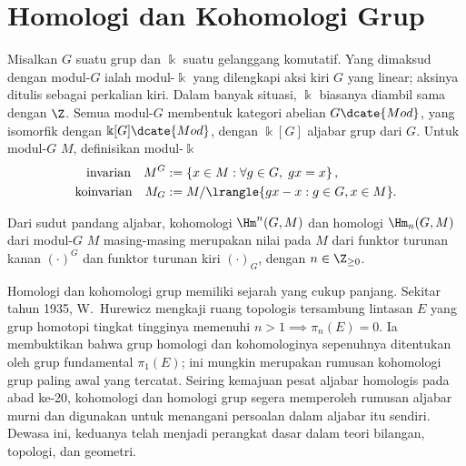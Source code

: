 
\chapter{Homologi dan Kohomologi Grup}\label{sec:group-coh}
\hypertarget{o014.aljabr2.chapter6.overview-g-modules-resolutions}{ }

Misalkan $G$ suatu grup dan $\Bbbk$ suatu gelanggang komutatif. Yang dimaksud
dengan modul-$G$ ialah modul-$\Bbbk$ yang dilengkapi aksi kiri $G$ yang linear;
aksinya ditulis sebagai perkalian kiri. Dalam banyak situasi, $\Bbbk$ biasanya
diambil sama dengan $\Z$. Semua modul-$G$ membentuk kategori abelian
$G\dcate{Mod}$, yang isomorfik dengan $\Bbbk[G]\dcate{Mod}$, dengan
$\Bbbk[G]$ aljabar grup dari $G$. Untuk modul-$G$ $M$, definisikan
modul-$\Bbbk$
\begin{align*}
	\text{invarian} \quad M^G & := \left\{x \in M: \forall g \in G, \; gx=x \right\}, \\
	\text{koinvarian} \quad M_G & := M / \lrangle{gx-x: g \in G, x \in M}.
\end{align*}

Dari sudut pandang aljabar, kohomologi $\Hm^n(G,M)$ dan homologi
$\Hm_n(G,M)$ dari modul-$G$ $M$ masing-masing merupakan nilai pada $M$ dari
funktor turunan kanan $(\cdot)^G$ dan funktor turunan kiri $(\cdot)_G$, dengan
$n\in\Z_{\geq0}$.

Homologi dan kohomologi grup memiliki sejarah yang cukup panjang. Sekitar tahun
1935, W.\ Hurewicz mengkaji ruang topologis tersambung lintasan $E$ yang grup
homotopi tingkat tingginya memenuhi
$n>1\implies\pi_n(E)=0$. Ia membuktikan bahwa grup homologi dan kohomologinya
sepenuhnya ditentukan oleh grup fundamental $\pi_1(E)$; ini mungkin merupakan
rumusan kohomologi grup paling awal yang tercatat. Seiring kemajuan pesat
aljabar homologis pada abad ke-20, kohomologi dan homologi grup segera
memperoleh rumusan aljabar murni dan digunakan untuk menangani persoalan dalam
aljabar itu sendiri. Dewasa ini, keduanya telah menjadi perangkat dasar dalam
teori bilangan, topologi, dan geometri.

